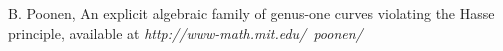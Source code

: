 \documentclass[12pt]{article}
\theoremstyle{plain}
\theoremstyle{definition}
\newcommand{\<}{\langle}
\renewcommand{\>}{\rangle}
\begin{document}
\begin{thebibliography}{9}
B. Poonen, An explicit algebraic family of genus-one curves violating the Hasse principle, available at \textit{http://www-math.mit.edu/~poonen/}


\end{thebibliography}
                                                                                                                                                                                                                                                                                                                                                                                                                                                                                                                                                                                                                                                                                                                                                                                                                                                                                                                                                                                                                                                                                                                                                                                                                                                                                                                                                                                                                                                                                                                                                                                                                                                                                                                                                                                                                                                                                                                                                                                                                                                                                                                                                                                                                                                                                                                                                                                                                                                                                                                                                                                                                                                                                                                                                                                                                                                                                                                                                                                                                                                                                                                     
\end{document}
